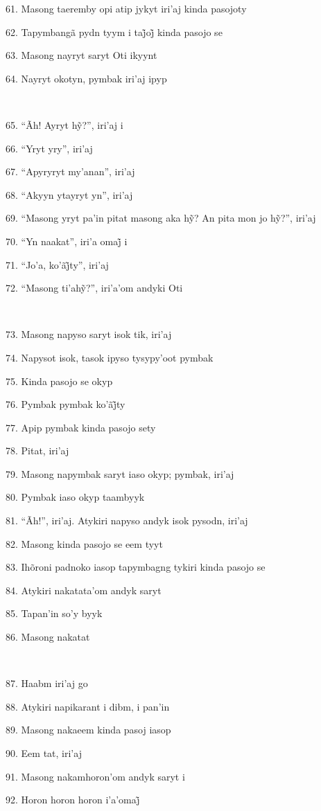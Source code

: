 61. Masong taeremby opi atip jykyt iri'aj kinda pasojoty

62. Tapymbangã pydn tyym i taj̃oj̃ kinda pasojo se

63. Masong nayryt saryt Oti ikyynt

64. Nayryt okotyn, pymbak iri'aj ipyp

~

65. ``Ãh! Ayryt hỹ?'', iri’aj i

66. ``Yryt yry'', iri'aj

67. ``Apyryryt my'anan'', iri'aj

68. ``Akyyn ytayryt yn'', iri'aj

69. ``Masong yryt pa’in pitat masong aka hỹ? An pita mon jo hỹ?'', iri’aj

70. ``Yn naakat'', iri’a omaj̃ i

71. ``Jo’a, ko’ãj̃ty'', iri’aj

72. ``Masong ti’ahỹ?'', iri’a’om andyki Oti

~

73. Masong napyso saryt isok tik, iri'aj

74. Napysot isok, tasok ipyso tysypy'oot pymbak

75. Kinda pasojo se okyp

76. Pymbak pymbak ko’ãj̃ty

77. Apip pymbak kinda pasojo sety

78. Pitat, iri'aj

79. Masong napymbak saryt iaso okyp; pymbak, iri'aj

80. Pymbak iaso okyp taambyyk

81. ``Ãh!'', iri'aj. Atykiri napyso andyk isok pysodn, iri'aj

82. Masong kinda pasojo se eem tyyt

83. Ihõroni padnoko iasop tapymbagng tykiri kinda pasojo se

84. Atykiri nakatata'om andyk saryt

85. Tapan'in so'y byyk

86. Masong nakatat

~

87. Haabm iri'aj go

88. Atykiri napikarant i dibm, i pan'in

89. Masong nakaeem kinda pasoj iasop

90. Eem tat, iri'aj

91. Masong nakamhoron'om andyk saryt i

92. Horon horon horon i’a’omaj̃

